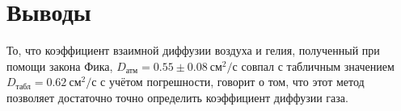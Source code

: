\chapter{Выводы}
\label{ch:conclusions}

То, что коэффициент взаимной диффузии воздуха и гелия, полученный при помощи закона Фика, $D_{\text{атм}} = 0.55 \pm 0.08~\text{см}^2/\text{с}$ совпал с табличным значением $D_{\text{табл}} = 0.62~\text{см}^2/\text{с}$ с учётом погрешности, говорит о том, что этот метод позволяет достаточно точно определить коэффициент диффузии газа. 